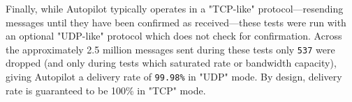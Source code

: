 Finally, while Autopilot typically operates in a "TCP-like" protocol---resending messages until they have been confirmed as received---these tests were run with an optional "UDP-like" protocol which does not check for confirmation. Across the approximately 2.5 million messages sent during these tests only \texttt{537} were dropped (and only during tests which saturated rate or bandwidth capacity), giving Autopilot a delivery rate of \texttt{99.98\%} in "UDP" mode. By design, delivery rate is guaranteed to be 100\% in "TCP" mode.
